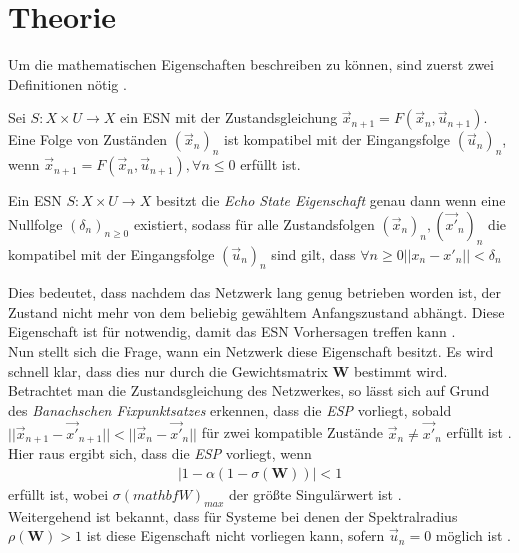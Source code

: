 \section{Theorie}
Um die mathematischen Eigenschaften beschreiben zu können, sind zuerst zwei Definitionen nötig \cite{yildiz}.

\begin{definition}
Sei $S : X \times U \rightarrow X$ ein \textsc{ESN} mit der Zustandsgleichung $\vec{x}_{n+1} = F \left( \vec{x}_n, \vec{u}_{n+1} \right)$. Eine Folge von Zuständen $(\vec{x}_n)_n$ ist kompatibel mit der Eingangsfolge $(\vec{u}_n)_n$, wenn $\vec{x}_{n+1} = F\left( \vec{x}_n, \vec{u}_{n+1} \right), \forall n \leq 0$ erfüllt ist.
\end{definition}

\begin{definition}
Ein \textsc{ESN} $S : X \times U \rightarrow X$ besitzt die \textit{Echo State Eigenschaft} genau dann wenn eine Nullfolge $(\delta_n)_{n \geq 0}$ existiert, sodass für alle Zustandsfolgen $(\vec{x}_n)_n, (\vec{x'}_n)_n$ die kompatibel mit der Eingangsfolge $(\vec{u}_n)_n$ sind gilt, dass $\forall n \geq 0 ||x_n - x'_n|| < \delta_n$
\end{definition} 
Dies bedeutet, dass nachdem das Netzwerk lang genug betrieben worden ist, der Zustand nicht mehr von dem beliebig gewähltem Anfangszustand abhängt. Diese Eigenschaft ist für notwendig, damit das \textsc{ESN} Vorhersagen treffen kann \cite{jeagerTut2002}.\\

Nun stellt sich die Frage, wann ein Netzwerk diese Eigenschaft besitzt. Es wird schnell klar, dass dies nur durch die Gewichtsmatrix $\mathbf{W}$ bestimmt wird. Betrachtet man die Zustandsgleichung des Netzwerkes, so lässt sich auf Grund des \textit{Banachschen Fixpunktsatzes} erkennen, dass die \textit{ESP} vorliegt, sobald $||\vec{x}_{n+1} - \vec{x'}_{n+1}|| < ||\vec{x}_n - \vec{x'}_n||$ für zwei kompatible Zustände $\vec{x}_n \neq \vec{x'}_n$ erfüllt ist \cite{jaeger2010}.
Hier raus ergibt sich, dass die \textit{ESP} vorliegt, wenn 
\begin{align}
\label{eq:theory_old_requirement}
|1-\alpha(1-\sigma(\mathbf{W}))| < 1
\end{align}
erfüllt ist, wobei $\sigma(mathbf{W})_{max}$ der größte Singulärwert ist \cite{jaeger2007}.\\
Weitergehend ist bekannt, dass für Systeme bei denen der Spektralradius $\rho(\mathbf{W}) > 1$ ist diese Eigenschaft nicht vorliegen kann, sofern $\vec{u}_n = 0$ möglich ist \cite{jaeger2007} \cite{jaeger2010}.\\

